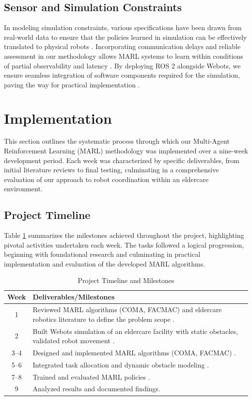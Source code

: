 \documentclass[conference]{IEEEtran}
\begin{document}
\subsection{Sensor and Simulation Constraints}
In modeling simulation constraints, various specifications have been drawn from real-world data to ensure that the policies learned in simulation can be effectively translated to physical robots \citep{yang2022}. Incorporating communication delays and reliable assessment in our methodology allows MARL systems to learn within conditions of partial observability and latency \citep{liu2023}. By deploying ROS 2 alongside Webots, we ensure seamless integration of software components required for the simulation, paving the way for practical implementation \citep{ztouni2021}.

\section{Implementation}
\label{sec:implementation}
This section outlines the systematic process through which our Multi-Agent Reinforcement Learning (MARL) methodology was implemented over a nine-week development period. Each week was characterized by specific deliverables, from initial literature reviews to final testing, culminating in a comprehensive evaluation of our approach to robot coordination within an eldercare environment.

\subsection{Project Timeline}
Table \ref{tab:timeline} summarizes the milestones achieved throughout the project, highlighting pivotal activities undertaken each week. The tasks followed a logical progression, beginning with foundational research and culminating in practical implementation and evaluation of the developed MARL algorithms.

\begin{table}[h]
\caption{Project Timeline and Milestones}
\label{tab:timeline}
\begin{tabular}{|c|p{6cm}|}
\hline
\textbf{Week} & \textbf{Deliverables/Milestones} \\
\hline
1 & Reviewed MARL algorithms (COMA, FACMAC) and eldercare robotics literature to define the problem scope \citep{wang2023a, salinas2023}. \\
2 & Built Webots simulation of an eldercare facility with static obstacles, validated robot movement \citep{ztouni2021}. \\
3--4 & Designed and implemented MARL algorithms (COMA, FACMAC) \citep{wang2023a}. \\
5--6 & Integrated task allocation and dynamic obstacle modeling \citep{kayy2017, yang2022}. \\
7--8 & Trained and evaluated MARL policies \citep{salinas2023}. \\
9 & Analyzed results and documented findings. \\
\hline
\end{tabular}
\end{table}
\end{document}
